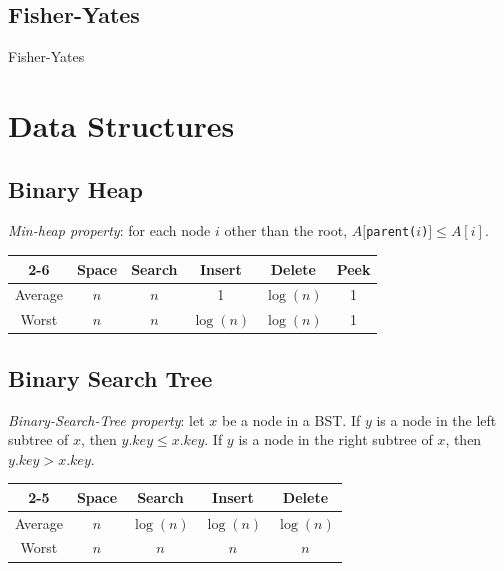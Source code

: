 \documentclass[a4paper, 12pt]{article}
\begin{document}
  \subsection{Fisher-Yates}

\IncMargin{2em}
\begin{algorithm}[H]
\caption{Fisher-Yates}
\vspace{0.1cm}
\Indm
{}
\Indp
\vspace{0.1cm}
\end{algorithm}
\DecMargin{2em}

\section{Data Structures}

	\subsection{Binary Heap}

\textit{Min-heap property}: for each node $i$ other than the root, $A[$\texttt{parent(}$i$\texttt{)}$] \le A[i]$.

\begin{center}	
\begin{tabular}{| c | c | c | c | c | c |}
\cline{2-6}
\multicolumn{1}{c |}{} & Space & Search & Insert & Delete & Peek \\
\hline
Average & $n$ & $n$ & 1 & $\log(n)$ & 1 \\
\hline
Worst & $n$ & $n$ & $\log(n)$ & $\log(n)$ & 1 \\
\hline
\end{tabular}
\end{center}

  \subsection{Binary Search Tree}

\textit{Binary-Search-Tree property}: let $x$ be a node in a BST. If $y$ is a node in the left subtree of $x$, then $y.key \le x.key$. If $y$ is a node in the right subtree of $x$, then $y.key > x.key$.

\begin{center}	
\begin{tabular}{| c | c | c | c | c |}
\cline{2-5}
\multicolumn{1}{c |}{} & Space & Search & Insert & Delete \\
\hline
Average & $n$ & $\log(n)$ & $\log(n)$ & $\log(n)$ \\
\hline
Worst & $n$ & $n$ & $n$ & $n$ \\
\hline
\end{tabular}
\end{center}
	
\end{document}

